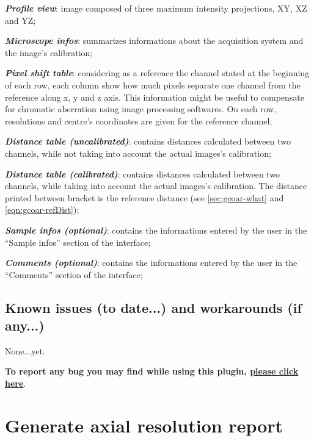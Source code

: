 \documentclass[a4paper, 11pt]{report}%
\makeatletter
\newcommand{\mailbug}{\begin{center}\textbf{To report any bug you may find while using this plugin, \href{mailto:fabrice.cordelieres@gmail.com,cedric.matthews@ibdml.univ-mrs.fr ?subject=Bug\%20found\%20in\%20MetroloJ&body=\%0ABug\%20description:\%0A\%0AHow\%20did\%20it\%20happen:\%0A\%0ACopy/Paste\%20the\%20content\%20of\%20the\%20log\%20window\%0A\%0AVersion\%20of\%20ImageJ:\%0A\%0AVersion\%20of\%20Java:}{please click here}}.\end{center}}
\makeatother
\begin{document}
\begin{itemize*}
	\item \textbf{\textit{Profile view}}: image composed of three maximum intensity projections, XY, XZ and YZ;
	\item \textbf{\textit{Microscope infos}}: summarizes informations about the acquisition system and the image's calibration;
	\item \textbf{\textit{Pixel shift table}}: considering as a reference the channel stated at the beginning of each row, each column show how much pixels separate one channel from the reference along x, y and z axis. This information might be useful to compensate for chromatic aberration using image processing softwares. On each row, resolutions and centre's coordinates are given for the reference channel;
	\item \textbf{\textit{Distance table (uncalibrated)}}: contains distances calculated between two channels, while not taking into account the actual images's calibration;
	\item \textbf{\textit{Distance table (calibrated)}}: contains distances calculated between two channels, while taking into account the actual images's calibration. The distance printed between bracket is the reference distance (see \ref{sec:gcoar-what} and \ref{eqn:gcoar-refDist});
	\item \textbf{\textit{Sample infos (optional)}}: contains the informations entered by the user in the ``Sample infos'' section of the interface;
	\item \textbf{\textit{Comments (optional)}}: contains the informations entered by the user in the ``Comments'' section of the interface;
\end{itemize*}

\section{Known issues (to date...) and workarounds (if any...)}
\label{sec:gcoar-ki}

None...yet.

\mailbug

\chapter{Generate axial resolution report}
\label{chap:garr}
\end{document}

